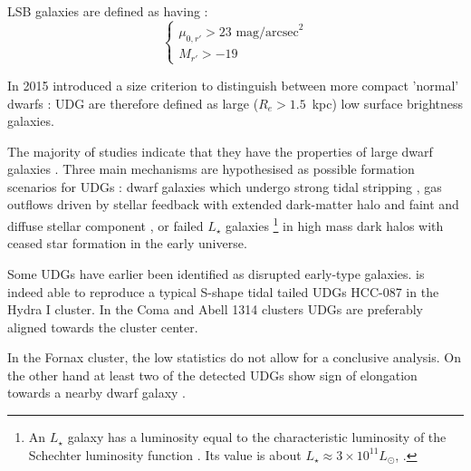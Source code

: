 LSB galaxies are defined as having \citep{Venhola2017}:
\begin{equation}
\begin{cases}
 \mu_{0,r'} > 23 \mbox{ mag/arcsec}^2\\
 M_{r'} > -19
\end{cases}
\end{equation}

In 2015 \citet{VanDokkum2015} introduced a size criterion to distinguish between more compact 'normal' dwarfs \citep{Sales2021}:
UDG are therefore defined as large ($R_e > 1.5$~kpc) low surface brightness galaxies.

The majority of studies indicate that they have the properties of large dwarf galaxies \citep{Sandage1984, Roman2017, Venhola2017, Saifollahi2021}.
Three main mechanisms are hypothesised as possible formation scenarios for UDGs \citep{Rong2020}:
dwarf galaxies which undergo strong tidal stripping \citep{Venhola2017, Carleton2018, Rong2020a},
gas outflows driven by stellar feedback with extended dark-matter halo and faint and diffuse stellar component \citep{DiCintio2017, ManceraPina2019},
or failed $L_\star$ galaxies
\footnote{An $L_\star$ galaxy has a luminosity equal to the characteristic luminosity of the Schechter luminosity function \citep{Press1974}.
Its value is about $L_\star \approx 3\times10^{11}L_\odot$, \cf{}  \citet{Cooray2005}.}
in high mass dark halos with ceased star formation in the early universe.

Some UDGs have earlier been identified as disrupted early-type galaxies.
\citet{Koch2012} is indeed able to reproduce a typical S-shape tidal tailed UDGs HCC-087 in the Hydra I cluster.
In the Coma and Abell 1314 clusters \citep{Yagi2016, ManceraPina2019} UDGs are preferably aligned towards the cluster center.

In the Fornax cluster, the low statistics do not allow for a conclusive analysis.
On the other hand at least two of the detected UDGs show sign of elongation towards a nearby dwarf galaxy \citep[with $M_{r'} > -19$~mag, see][]{Venhola2017}.

